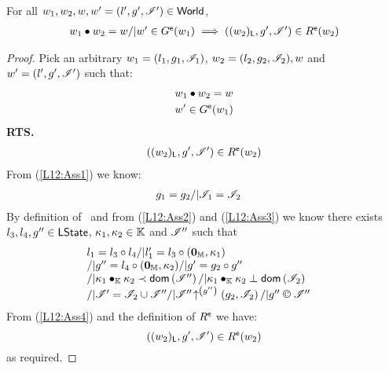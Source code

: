 %
%
\begin{lemma}[]\label{lem:extendGContainment}
%
For all $w_1, w_2, w, w' = (l', g', \mathscr{I}') \in \textsf{World}$,
\[
\begin{array}{l}
	w_1 \bullet w_2 = w /| w' \in G^{\textsf{e}}(w_1) \implies ((w_2)_{\textsf{L}}, g', \mathscr{I}') \in R^{\textsf{e}}(w_2)
\end{array}
\]
%
\begin{proof} Pick an arbitrary $w_1 = (l_1, g_1, \mathscr{I}_{1})$, $w_2 = (l_2, g_2, \mathscr{I}_{2}), w$ and $ w' = (l', g', \mathscr{I}')$ such that:
%
\begin{align}
	& w_1 \bullet  w_2 = w \label{L12:Ass1}\\
	& w' \in G^{\textsf{e}}(w_1) \label{L12:Ass2}
\end{align}
%
\textbf{RTS.}
%
\begin{align*}
	((w_2)_{\textsf{L}}, g', \mathscr{I}') \in R^{\textsf{e}}(w_2) 
\end{align*}
%
From (\ref{L12:Ass1}) we know:
%
\begin{align}
	& g_1 = g_2 /| \mathscr{I}_{1} = \mathscr{I}_{2} \label{L12:Ass3}
\end{align}
By definition of \extendG\ and from (\ref{L12:Ass2}) and (\ref{L12:Ass3}) we know there exists $l_3, l_4, g'' \in \textsf{LState}$, $\kappa_{1}, \kappa_{2} \in \mathbb{K}$ and $\mathscr{I}''$ such that
%
\begin{align}
& \begin{array}{l}
	l_1 = l_3 \composeL l_4 /| l'_1 = l_3 \composeL (\unitH, \ca{1})  \\
	/| g'' = l_4 \composeL (\unitH, \ca{2}) /| g' = g_2 \composeL g'' \\
	/| \ca{1} \composeCap \ca{2} \containedIn \dom{\lmod''} /|  \ca{1} \composeCap \ca{2} \disjoint \dom{\lmod_{2}} \\
	/| \lmod' = \lmod_{2} \cup \lmod'' 
	/| \expandsAM{\lmod''}{g''}{g_2}{\lmod_{2}} 
	/| g'' \containI \lmod'' 
\end{array}
\label{L12:Ass4}
\end{align}
%
From (\ref{L12:Ass4}) and the definition of $R^{\textsf{e}}$ we have:
%
\begin{equation*}
	((w_2)_{\textsf{L}}, g', \mathscr{I}{}') \in R^{\textsf{e}}(w_2) 
\end{equation*}
% 
as required.
\end{proof}
%
%
\end{lemma}
%
